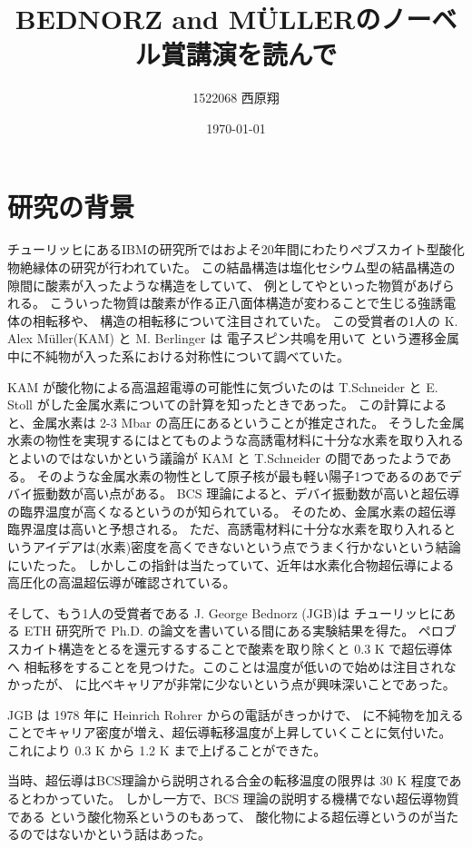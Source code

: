 \documentclass[11pt,dvipdfmx,a4paper]{jsarticle}
\title{BEDNORZ and M\"{U}LLERのノーベル賞講演を読んで}
\author{1522068 西原翔}
\date{\today}
\begin{document}
\maketitle
\section{研究の背景}
チューリッヒにあるIBMの研究所ではおよそ20年間にわたりぺブスカイト型酸化物絶縁体の研究が行われていた。
この結晶構造は塩化セシウム型の結晶構造の隙間に酸素が入ったような構造をしていて、
例としてやといった物質があげられる。
こういった物質は酸素が作る正八面体構造が変わることで生じる強誘電体の相転移や、
構造の相転移について注目されていた。
この受賞者の1人の K. Alex M\"{u}ller(KAM) と M. Berlinger は
電子スピン共鳴を用いて という遷移金属中に不純物が入った系における対称性について調べていた。

KAM が酸化物による高温超電導の可能性に気づいたのは T.Schneider と E. Stoll がした金属水素についての計算を知ったときであった。
この計算によると、金属水素は 2-3 Mbar の高圧にあるということが推定された。
そうした金属水素の物性を実現するにはとてものような高誘電材料に十分な水素を取り入れるとよいのではないかという議論が
KAM と T.Schneider の間であったようである。
そのような金属水素の物性として原子核が最も軽い陽子1つであるのあでデバイ振動数が高い点がある。
BCS 理論によると、デバイ振動数が高いと超伝導の臨界温度が高くなるというのが知られている。
そのため、金属水素の超伝導臨界温度は高いと予想される。
ただ、高誘電材料に十分な水素を取り入れるというアイデアは(水素)密度を高くできないという点でうまく行かないという結論にいたった。
しかしこの指針は当たっていて、近年は水素化合物超伝導による高圧化の高温超伝導が確認されている。

そして、もう1人の受賞者である J. George Bednorz (JGB)は
チューリッヒにある ETH 研究所で Ph.D. の論文を書いている間にある実験結果を得た。
ペロブスカイト構造をとるを還元するすることで酸素を取り除くと 0.3 K で超伝導体へ
相転移をすることを見つけた。このことは温度が低いので始めは注目されなかったが、
に比べキャリアが非常に少ないという点が興味深いことであった。

JGB は 1978 年に Heinrich Rohrer からの電話がきっかけで、
に不純物を加えることでキャリア密度が増え、超伝導転移温度が上昇していくことに気付いた。
これにより 0.3 K から 1.2 K まで上げることができた。

当時、超伝導はBCS理論から説明される合金の転移温度の限界は 30 K 程度であるとわかっていた。
しかし一方で、BCS 理論の説明する機構でない超伝導物質である という酸化物系というのもあって、
酸化物による超伝導というのが当たるのではないかという話はあった。
\end{document}
